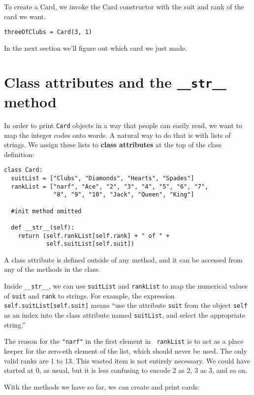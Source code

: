 
To create a Card, we invoke the Card constructor with the
suit and rank of the card we want.

\beforeverb
\begin{verbatim}
threeOfClubs = Card(3, 1)
\end{verbatim}
\afterverb
%
In the next section we'll figure out which card we just made.


\section{Class attributes and the {\tt \_\_str\_\_} method}

In order to print {\tt Card} objects in a way that people can easily
read, we want to map the integer codes onto words.  A natural way to
do that is with lists of strings.  We assign these lists to {\bf class
attributes} at the top of the class definition:

\beforeverb
\begin{verbatim}
class Card:
  suitList = ["Clubs", "Diamonds", "Hearts", "Spades"]
  rankList = ["narf", "Ace", "2", "3", "4", "5", "6", "7", 
              "8", "9", "10", "Jack", "Queen", "King"]

  #init method omitted

  def __str__(self):
    return (self.rankList[self.rank] + " of " + 
            self.suitList[self.suit])
\end{verbatim}
\afterverb
%
A class attribute is defined outside of any method, and it can be
accessed from any of the methods in the class.

Inside {\tt \_\_str\_\_}, we can use {\tt suitList} and {\tt rankList}
to map the numerical values of {\tt suit} and {\tt rank} to strings.
For example, the expression \verb+self.suitList[self.suit]+ means
``use the attribute {\tt suit} from the object {\tt self} as an index
into the class attribute named {\tt suitList}, and select the
appropriate string.''

The reason for the {\tt "narf"} in the first element in {\tt
rankList} is to act as a place keeper for the zero-eth element of the
list, which should never be used.  The only valid ranks are 1 to 13.  This
wasted item is not entirely necessary.  We could have started at 0,
as usual, but it is less confusing to encode 2 as 2, 3 as 3, and so on.

With the methods we have so far, we can create and print cards:

